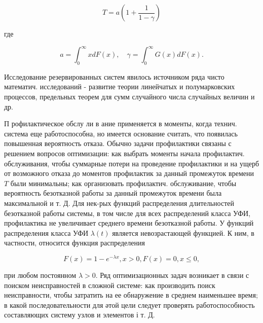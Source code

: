 \documentclass[10pt]{article}
\begin{document}
\[

T=a\left(1+\frac{1}{1-\gamma}\right)

\]



где



\[

a=\int_{0}^{\infty} x d F(x), \quad \gamma=\int_{0}^{\infty} G(x) d F(x) .

\]



Исследование резервированных систем явилось источником ряда чисто математич. исследований - развитие теории линейчатых и полумарковских процессов, предельных теорем для сумм случайного числа случайных величин и др.



П рофилактическое обслу ли в ание применяется в моменты, когда технич. система еще работоспособна, но имеется основание считать, что появилась повышенная вероятность отказа. Обычно задачи профилактики связаны с решением вопросов оптимизации: как выбрать моменты начала профилактич. обслуживания, чтобы суммарные потери на проведение профилактики и на ущерб от возможного отказа до моментов профилактик за данный промежуток времени $T$ были минимальны; как организовать профилактич. обслуживание, чтобы вероятность безотказной работы за данный промежуток времени была максимальной и т. Д. Для нек-рых функций распределения длительностей безотказной работы системы, в том числе для всех распределений класса УФИ, профилактика не увеличивает среднего времени безотказной работы. У функций распределения класса УФИ $\lambda(t)$ является невозрастающей функцией. $К$ ним, в частности, относится функция распределения



\[

F(x)=1-e^{-\lambda x}, x>0, F(x)=0, x \leqslant 0,

\]



при любом постоянном $\lambda>0$. Ряд оптимизационных задач возникает в связи с поиском неисправностей в сложной системе: как производить поиск неисправности, чтобы затратить на ее обнаружение в среднем наименьшее время; в какой последовательности для әтой цели следует проверять работоспособность составляющих систему узлов и элементов і т. Д.
\end{document}
